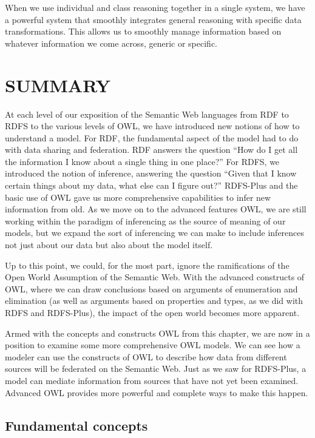 When we use individual and class reasoning together in a single system,
we have a powerful system that smoothly integrates general reasoning
with specific data transformations. This allows us to smoothly manage
information based on whatever information we come across, generic or
specific.

\section{SUMMARY}

At each level of our exposition of the Semantic Web languages from RDF
to RDFS to the various levels of OWL, we have introduced new notions of
how to understand a model. For RDF, the fundamental aspect of the model
had to do with data sharing and federation. RDF answers the question
``How do I get all the information I know about a single thing in one
place?'' For RDFS, we introduced the notion of inference, answering the
question ``Given that I know certain things about my data, what else can
I figure out?'' RDFS-Plus and the basic use of OWL gave us more
comprehensive capabilities to infer new information from old. As we move
on to the advanced features OWL, we are still working within the
paradigm of inferencing as the source of meaning of our models, but we
expand the sort of inferencing we can make to include inferences not
just about our data but also about the model itself.

Up to this point, we could, for the most part, ignore the ramifications
of the Open World Assumption of the Semantic Web. With the advanced
constructs of OWL, where we can draw conclusions based on arguments of
enumeration and elimination (as well as arguments based on properties
and types, as we did with RDFS and RDFS-Plus), the impact of the open
world becomes more apparent.

Armed with the concepts and constructs OWL from this chapter, we are now
in a position to examine some more comprehensive OWL models. We can see
how a modeler can use the constructs of OWL to describe how data from
different sources will be federated on the Semantic Web. Just as we saw
for RDFS-Plus, a model can mediate information from sources that have
not yet been examined. Advanced OWL provides more powerful and complete
ways to make this happen.

\subsection{Fundamental concepts}

